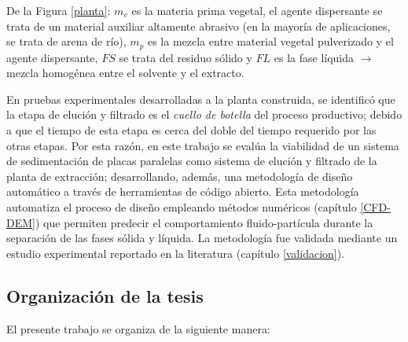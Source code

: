 \noindent
\justify

De la Figura \ref{planta}: $m_v$ es la materia prima vegetal, el agente dispersante se trata de un material auxiliar altamente abrasivo (en la mayor\'ia de aplicaciones, se trata de arena de r\'io), $m_p$ es la mezcla entre material vegetal pulverizado y el agente dispersante, $FS$ se trata del residuo s\'olido y $FL$ es la fase l\'iquida $\rightarrow$ mezcla homog\'enea entre el solvente y el extracto.

\noindent
\justify

En pruebas experimentales desarrolladas a la planta construida, se identific\'o que la etapa de eluci\'on y filtrado es el \textit{cuello de botella} del proceso productivo; debido a que el tiempo de esta etapa es cerca del doble del tiempo requerido por las otras etapas. Por esta raz\'on, en este trabajo se eval\'ua la viabilidad de un sistema de sedimentaci\'on de placas paralelas como sistema de eluci\'on y filtrado de la planta de extracci\'on; desarrollando, adem\'as, una metodolog\'ia de dise\~no autom\'atico a trav\'es de herramientas de c\'odigo abierto. Esta metodolog\'ia automatiza el proceso de dise\~no empleando m\'etodos num\'ericos (cap\'itulo \ref{CFD-DEM}) que permiten predecir el comportamiento fluido-part\'icula durante la separaci\'on de las fases s\'olida y l\'iquida. La metodolog\'ia fue validada mediante un estudio experimental reportado en la literatura (cap\'itulo \ref{validacion}). 


\newpage

\subsection{Organizaci\'on de la tesis}

\noindent
\justify

El presente trabajo se organiza de la siguiente manera:

